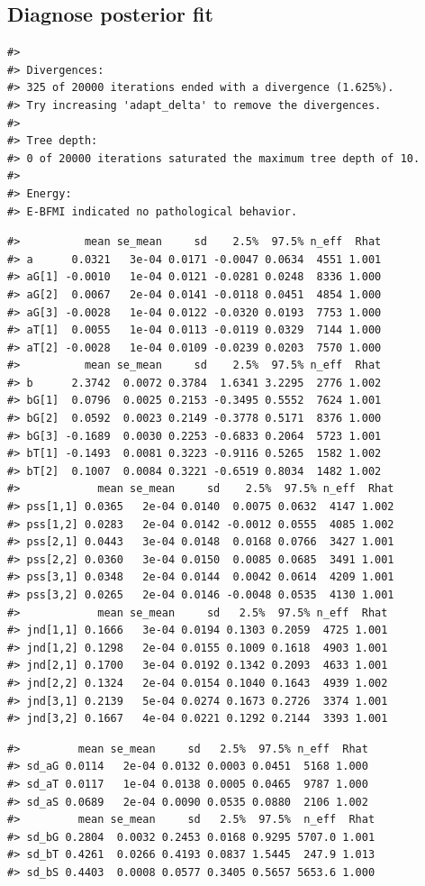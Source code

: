 \documentclass[11pt, oneside, openany]{scrbook}
\begin{document}
\hypertarget{iter3-diagnose-post}{%
\subsection{Diagnose posterior fit}\label{iter3-diagnose-post}}

\begin{verbatim}
#> 
#> Divergences:
#> 325 of 20000 iterations ended with a divergence (1.625%).
#> Try increasing 'adapt_delta' to remove the divergences.
#> 
#> Tree depth:
#> 0 of 20000 iterations saturated the maximum tree depth of 10.
#> 
#> Energy:
#> E-BFMI indicated no pathological behavior.
\end{verbatim}

\begin{verbatim}
#>          mean se_mean     sd    2.5%  97.5% n_eff  Rhat
#> a      0.0321   3e-04 0.0171 -0.0047 0.0634  4551 1.001
#> aG[1] -0.0010   1e-04 0.0121 -0.0281 0.0248  8336 1.000
#> aG[2]  0.0067   2e-04 0.0141 -0.0118 0.0451  4854 1.000
#> aG[3] -0.0028   1e-04 0.0122 -0.0320 0.0193  7753 1.000
#> aT[1]  0.0055   1e-04 0.0113 -0.0119 0.0329  7144 1.000
#> aT[2] -0.0028   1e-04 0.0109 -0.0239 0.0203  7570 1.000
#>          mean se_mean     sd    2.5%  97.5% n_eff  Rhat
#> b      2.3742  0.0072 0.3784  1.6341 3.2295  2776 1.002
#> bG[1]  0.0796  0.0025 0.2153 -0.3495 0.5552  7624 1.001
#> bG[2]  0.0592  0.0023 0.2149 -0.3778 0.5171  8376 1.000
#> bG[3] -0.1689  0.0030 0.2253 -0.6833 0.2064  5723 1.001
#> bT[1] -0.1493  0.0081 0.3223 -0.9116 0.5265  1582 1.002
#> bT[2]  0.1007  0.0084 0.3221 -0.6519 0.8034  1482 1.002
#>            mean se_mean     sd    2.5%  97.5% n_eff  Rhat
#> pss[1,1] 0.0365   2e-04 0.0140  0.0075 0.0632  4147 1.002
#> pss[1,2] 0.0283   2e-04 0.0142 -0.0012 0.0555  4085 1.002
#> pss[2,1] 0.0443   3e-04 0.0148  0.0168 0.0766  3427 1.001
#> pss[2,2] 0.0360   3e-04 0.0150  0.0085 0.0685  3491 1.001
#> pss[3,1] 0.0348   2e-04 0.0144  0.0042 0.0614  4209 1.001
#> pss[3,2] 0.0265   2e-04 0.0146 -0.0048 0.0535  4130 1.001
#>            mean se_mean     sd   2.5%  97.5% n_eff  Rhat
#> jnd[1,1] 0.1666   3e-04 0.0194 0.1303 0.2059  4725 1.001
#> jnd[1,2] 0.1298   2e-04 0.0155 0.1009 0.1618  4903 1.001
#> jnd[2,1] 0.1700   3e-04 0.0192 0.1342 0.2093  4633 1.001
#> jnd[2,2] 0.1324   2e-04 0.0154 0.1040 0.1643  4939 1.002
#> jnd[3,1] 0.2139   5e-04 0.0274 0.1673 0.2726  3374 1.001
#> jnd[3,2] 0.1667   4e-04 0.0221 0.1292 0.2144  3393 1.001
\end{verbatim}

\begin{verbatim}
#>         mean se_mean     sd   2.5%  97.5% n_eff  Rhat
#> sd_aG 0.0114   2e-04 0.0132 0.0003 0.0451  5168 1.000
#> sd_aT 0.0117   1e-04 0.0138 0.0005 0.0465  9787 1.000
#> sd_aS 0.0689   2e-04 0.0090 0.0535 0.0880  2106 1.002
#>         mean se_mean     sd   2.5%  97.5%  n_eff  Rhat
#> sd_bG 0.2804  0.0032 0.2453 0.0168 0.9295 5707.0 1.001
#> sd_bT 0.4261  0.0266 0.4193 0.0837 1.5445  247.9 1.013
#> sd_bS 0.4403  0.0008 0.0577 0.3405 0.5657 5653.6 1.000
\end{verbatim}
\end{document}
